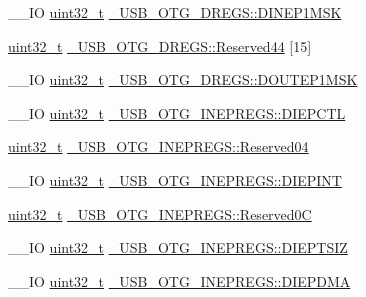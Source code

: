 \begin{DoxyCompactItemize}
\item 
\-\_\-\-\_\-\-I\-O \hyperlink{stdint_8h_a435d1572bf3f880d55459d9805097f62}{uint32\-\_\-t} \hyperlink{group___u_s_b___o_t_g___d_r_i_v_e_r_ga0a3dfb0231a4e0a397d873eee59309bb}{\-\_\-\-U\-S\-B\-\_\-\-O\-T\-G\-\_\-\-D\-R\-E\-G\-S\-::\-D\-I\-N\-E\-P1\-M\-S\-K}
\item 
\hyperlink{stdint_8h_a435d1572bf3f880d55459d9805097f62}{uint32\-\_\-t} \hyperlink{group___u_s_b___o_t_g___d_r_i_v_e_r_ga952a36bd6f113cca88281709a893e58d}{\-\_\-\-U\-S\-B\-\_\-\-O\-T\-G\-\_\-\-D\-R\-E\-G\-S\-::\-Reserved44} \mbox{[}15\mbox{]}
\item 
\-\_\-\-\_\-\-I\-O \hyperlink{stdint_8h_a435d1572bf3f880d55459d9805097f62}{uint32\-\_\-t} \hyperlink{group___u_s_b___o_t_g___d_r_i_v_e_r_gaea965165ff1048dba0abc17c284f3e79}{\-\_\-\-U\-S\-B\-\_\-\-O\-T\-G\-\_\-\-D\-R\-E\-G\-S\-::\-D\-O\-U\-T\-E\-P1\-M\-S\-K}
\item 
\-\_\-\-\_\-\-I\-O \hyperlink{stdint_8h_a435d1572bf3f880d55459d9805097f62}{uint32\-\_\-t} \hyperlink{group___u_s_b___o_t_g___d_r_i_v_e_r_ga6891238f7ceac1ab150c9a7ae59219df}{\-\_\-\-U\-S\-B\-\_\-\-O\-T\-G\-\_\-\-I\-N\-E\-P\-R\-E\-G\-S\-::\-D\-I\-E\-P\-C\-T\-L}
\item 
\hyperlink{stdint_8h_a435d1572bf3f880d55459d9805097f62}{uint32\-\_\-t} \hyperlink{group___u_s_b___o_t_g___d_r_i_v_e_r_ga279df0532f0eacc582a40057e66be6f6}{\-\_\-\-U\-S\-B\-\_\-\-O\-T\-G\-\_\-\-I\-N\-E\-P\-R\-E\-G\-S\-::\-Reserved04}
\item 
\-\_\-\-\_\-\-I\-O \hyperlink{stdint_8h_a435d1572bf3f880d55459d9805097f62}{uint32\-\_\-t} \hyperlink{group___u_s_b___o_t_g___d_r_i_v_e_r_ga8dc7ac6e8918bb44f5733777eddcc6dc}{\-\_\-\-U\-S\-B\-\_\-\-O\-T\-G\-\_\-\-I\-N\-E\-P\-R\-E\-G\-S\-::\-D\-I\-E\-P\-I\-N\-T}
\item 
\hyperlink{stdint_8h_a435d1572bf3f880d55459d9805097f62}{uint32\-\_\-t} \hyperlink{group___u_s_b___o_t_g___d_r_i_v_e_r_gaf8e2de19087dd5857ee7b735513f65d8}{\-\_\-\-U\-S\-B\-\_\-\-O\-T\-G\-\_\-\-I\-N\-E\-P\-R\-E\-G\-S\-::\-Reserved0\-C}
\item 
\-\_\-\-\_\-\-I\-O \hyperlink{stdint_8h_a435d1572bf3f880d55459d9805097f62}{uint32\-\_\-t} \hyperlink{group___u_s_b___o_t_g___d_r_i_v_e_r_ga790a66756ca5fa1a3f5127ba50a8bc0a}{\-\_\-\-U\-S\-B\-\_\-\-O\-T\-G\-\_\-\-I\-N\-E\-P\-R\-E\-G\-S\-::\-D\-I\-E\-P\-T\-S\-I\-Z}
\item 
\-\_\-\-\_\-\-I\-O \hyperlink{stdint_8h_a435d1572bf3f880d55459d9805097f62}{uint32\-\_\-t} \hyperlink{group___u_s_b___o_t_g___d_r_i_v_e_r_gafdee8155f2a0a978227fbe4c7dc3d150}{\-\_\-\-U\-S\-B\-\_\-\-O\-T\-G\-\_\-\-I\-N\-E\-P\-R\-E\-G\-S\-::\-D\-I\-E\-P\-D\-M\-A}

\end{DoxyCompactItemize}
